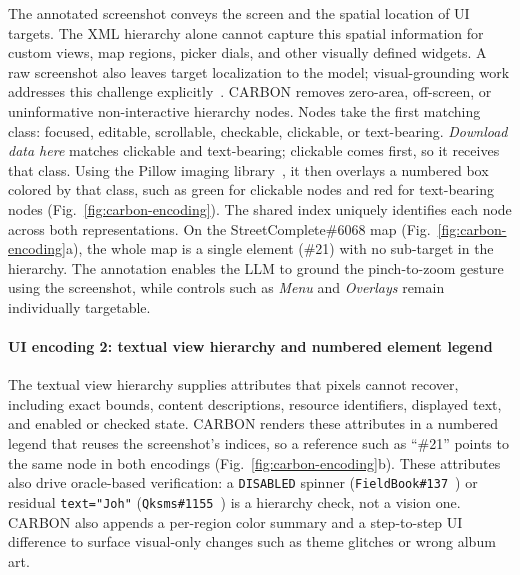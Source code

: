 \documentclass[10pt,conference,a4paper]{IEEEtran}
\begin{document}
The annotated screenshot conveys the screen and the spatial location of UI targets. The XML hierarchy alone cannot capture this spatial information for custom views, map regions, picker dials, and other visually defined widgets. A raw screenshot also leaves target localization to the model; visual-grounding work addresses this challenge explicitly~\cite{cogagent,seeact}. CARBON removes zero-area, off-screen, or uninformative non-interactive hierarchy nodes. Nodes take the first matching class: focused, editable, scrollable, checkable, clickable, or text-bearing. \emph{Download data here} matches clickable and text-bearing; clickable comes first, so it receives that class. Using the Pillow imaging library~\cite{pillow}, it then overlays a numbered box colored by that class, such as green for clickable nodes and red for text-bearing nodes (Fig.~\ref{fig:carbon-encoding}). The shared index uniquely identifies each node across both representations. On the StreetComplete\#6068 map (Fig.~\ref{fig:carbon-encoding}a), the whole map is a single element (\#21) with no sub-target in the hierarchy. The annotation enables the LLM to ground the pinch-to-zoom gesture using the screenshot, while controls such as \emph{Menu} and \emph{Overlays} remain individually targetable.

  \paragraph*{UI encoding 2: textual view hierarchy and numbered element legend}
The textual view hierarchy supplies attributes that pixels cannot recover, including exact bounds, content descriptions, resource identifiers, displayed text, and enabled or checked state. CARBON renders these attributes in a numbered legend that reuses the screenshot's indices, so a reference such as ``\#21'' points to the same node in both encodings (Fig.~\ref{fig:carbon-encoding}b). These attributes also drive oracle-based verification: a \texttt{DISABLED} spinner (\texttt{FieldBook\#137}~\cite{fieldbook137}) or residual \texttt{text="Joh"} (\texttt{Qksms\#1155}~\cite{qksms1155}) is a hierarchy check, not a vision one. CARBON also appends a per-region color summary and a step-to-step UI difference to surface visual-only changes such as theme glitches or wrong album art.
\end{document}
